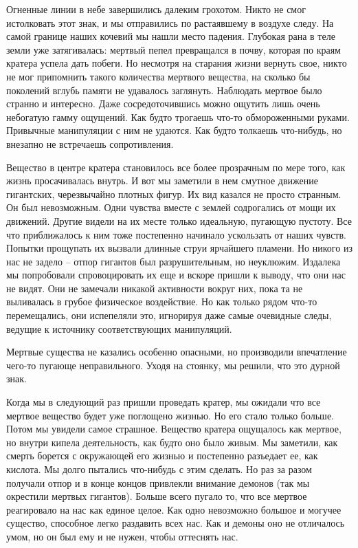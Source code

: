 \documentclass[12pt,a4paper]{article}
\begin{document}
Огненные линии в небе завершились далеким грохотом. Никто не смог истолковать этот знак, и мы отправились по растаявшему в воздухе следу. На самой границе наших кочевий мы нашли место падения. Глубокая рана в теле земли уже затягивалась: мертвый пепел превращался в почву, которая по краям кратера успела дать побеги. Но несмотря на старания жизни вернуть свое, никто не мог припомнить такого количества мертвого вещества, на сколько бы поколений вглубь памяти не удавалось заглянуть. Наблюдать мертвое было странно и интересно. Даже сосредоточившись можно ощутить лишь очень небогатую гамму ощущений. Как будто трогаешь что-то обмороженными руками. Привычные манипуляции с ним не удаются. Как будто толкаешь что-нибудь, но внезапно не встречаешь сопротивления.

Вещество в центре кратера становилось все более прозрачным по мере того, как жизнь просачивалась внутрь. И вот мы заметили в нем смутное движение гигантских, черезвычайно плотных фигур. Их вид казался не просто странным. Он был невозможным. Одни чувства вместе с землей содрогались от мощи их движений. Другие видели на их месте только идеальную, пугающую пустоту. Все что приближалось к ним тоже постепенно начинало ускользать от наших чувств. Попытки прощупать их вызвали длинные струи ярчайшего пламени. Но никого из нас не задело -- отпор гигантов был разрушительным, но неуклюжим. Издалека мы попробовали спровоцировать их еще и вскоре пришли к выводу, что они нас не видят. Они не замечали никакой активности вокруг них, пока та не выливалась в грубое физическое воздействие. Но как только рядом что-то перемещались, они испепеляли это, игнорируя даже самые очевидные следы, ведущие к источнику соответствующих манипуляций.

Мертвые существа не казались особенно опасными, но производили впечатление чего-то пугающе неправильного. Уходя на стоянку, мы решили, что это дурной знак.

Когда мы в следующий раз пришли проведать кратер, мы ожидали что все мертвое вещество будет уже поглощено жизнью. Но его стало только больше. Потом мы увидели самое страшное. Вещество кратера ощущалось как мертвое, но внутри кипела деятельность, как будто оно было живым. Мы заметили, как смерть борется с окружающей его жизнью и постепенно разъедает ее, как кислота. Мы долго пытались что-нибудь с этим сделать. Но раз за разом получали отпор и в конце концов привлекли внимание демонов (так мы окрестили мертвых гигантов). Больше всего пугало то, что все мертвое реагировало на нас как единое целое. Как одно невозможно большое и могучее существо, способное легко раздавить всех нас. Как и демоны оно не отличалось умом, но он был ему и не нужен, чтобы оттеснять нас.
\end{document}
